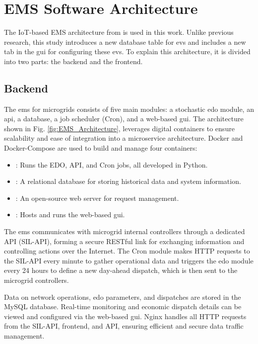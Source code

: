 \documentclass[preprint, 10pt, 5p]{elsarticle}
\begin{document}
\section{EMS Software Architecture}\label{sec:architecture}

The IoT-based EMS architecture from \cite{silva2023} is used in this work. 
Unlike previous research, this study introduces a new database 
table for \glspl{ev} and includes a new tab in the \gls{gui} 
for configuring these \glspl{ev}. To explain this architecture, 
it is divided into two parts: the backend and the frontend.

\subsection{Backend}

The \gls{ems} for microgrids consists of 
five main modules: a stochastic \gls{edo} module, 
an \gls{api}, a database, a job scheduler (Cron), and a web-based \gls{gui}. 
The architecture shown in Fig. \ref{fig:EMS_Architecture}, leverages digital 
containers to ensure scalability and ease of integration into 
a microservice architecture. Docker and Docker-Compose \cite{dockercompose} 
are used to build and manage four containers:

\begin{itemize}
    \item {}: Runs the EDO, API, and Cron jobs, 
    all developed in Python.
    \item {}: A relational database for storing 
    historical data and system information.
    \item {}: An open-source web server for request 
    management.
    \item {}: Hosts and runs the web-based 
    \gls{gui}.
\end{itemize}

The \gls{ems} communicates with microgrid internal controllers through a 
dedicated API (SIL-API), forming a secure RESTful link for exchanging 
information and controlling actions over the Internet. The Cron module 
makes HTTP requests to the SIL-API every minute to gather operational 
data and triggers the \gls{edo} module every 24 hours to define a new 
day-ahead dispatch, which is then sent to the microgrid controllers.

Data on network operations, \gls{edo} parameters, and dispatches are stored in 
the MySQL database. Real-time monitoring and economic dispatch details can be 
viewed and configured via the web-based \gls{gui}. 
Nginx \cite{nginx} handles all HTTP requests from the SIL-API, frontend, and API, ensuring 
efficient and secure data traffic management.
\end{document}
